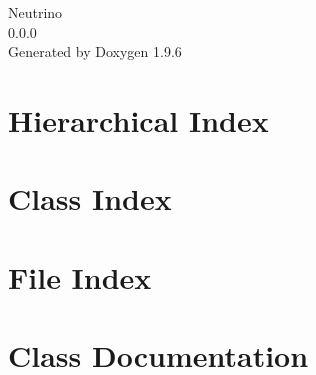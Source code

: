 \documentclass[twoside]{book}
\newcommand{\+}{\discretionary{\mbox{\scriptsize$\hookleftarrow$}}{}{}}
\newcommand{\clearemptydoublepage}{%
    \newpage{\pagestyle{empty}\cleardoublepage}%
  }
\begin{document}
  \raggedbottom
    \hypersetup{pageanchor=false,
                bookmarksnumbered=true,
                pdfencoding=unicode
               }
  \begin{titlepage}
  \vspace*{7cm}
  \begin{center}%
  {\Large Neutrino}\\
  [1ex]\large 0.\+0.\+0 \\
  \vspace*{1cm}
  {\large Generated by Doxygen 1.9.6}\\
  \end{center}
  \end{titlepage}
  \clearemptydoublepage
  \tableofcontents
  \clearemptydoublepage
  \hypersetup{pageanchor=true}
\chapter{Hierarchical Index}

\chapter{Class Index}

\chapter{File Index}

\chapter{Class Documentation}






























\end{document}
